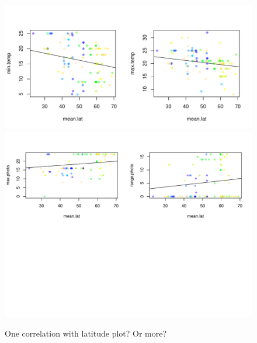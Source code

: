 \documentclass[11pt,letterpaper]{article}
\begin{document}
\begin{figure}[t!]
\centering
\includegraphics[width=1\textwidth]{..//..//analyses/limitingcues/figures/tempxlatminmaxcorr.pdf}
\includegraphics[width=1\textwidth]{..//..//analyses/limitingcues/figures/photoxlatcorr2plots.pdf}
\caption{One correlation with latitude plot? Or more?}
  \label{fig:lat}
\end{figure}
\clearpage
\end{document}
